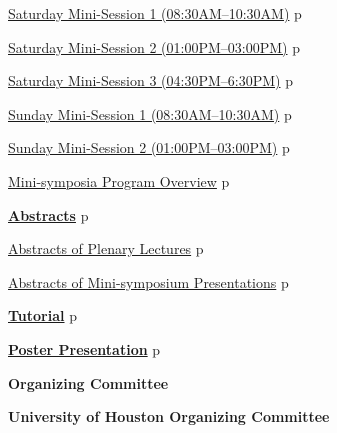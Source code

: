 \noindent\quad\hyperref[mini-saturday1]{{\large Saturday Mini-Session 1 (08:30AM--10:30AM)}}%
\dotfill{}p\pageref{mini-saturday1}
\vspace{1ex}

\noindent\quad\hyperref[mini-saturday2]{{\large Saturday Mini-Session 2 (01:00PM--03:00PM)}}%
\dotfill{}p\pageref{mini-saturday2}
\vspace{1ex}

\noindent\quad\hyperref[mini-saturday3]{{\large Saturday Mini-Session 3 (04:30PM--6:30PM)}}%
\dotfill{}p\pageref{mini-saturday3}
\vspace{2ex}

\noindent\quad\hyperref[mini-sunday1]{{\large Sunday Mini-Session 1 (08:30AM--10:30AM)}}
\dotfill{}p\pageref{mini-sunday1}
\vspace{1ex}

\noindent\quad\hyperref[mini-sunday2]{{\large Sunday Mini-Session 2 (01:00PM--03:00PM)}}%
\dotfill{}p\pageref{mini-sunday2}
\vspace{3ex}

\noindent\quad\hyperref[prog-overview]{{\large Mini-symposia Program Overview}}%
\dotfill{}p\pageref{prog-overview}
\vspace{3ex}

\noindent\hyperref[abstracts]{{\bfseries\large Abstracts}}%
\dotfill{}p\pageref{abstracts}
\vspace{2ex}

\noindent\quad\hyperref[plenary]{{\large  Abstracts of Plenary Lectures}}%
\dotfill{}p\pageref{plenary}
\vspace{1ex}

\noindent\quad\hyperref[absmini]{{\large  Abstracts of Mini-symposium Presentations}}%
\dotfill{}p\pageref{absmini}
\vspace{3ex}

\noindent\hyperref[tutorial]{{\bfseries\large  Tutorial}}%
\dotfill{}p\pageref{tutorial}
\vspace{3ex}

\noindent\hyperref[poster]{{\bfseries\large  Poster Presentation}}
\dotfill{}p\pageref{poster}

\newpage\newpage
\thispagestyle{empty}
\newpage
\clearpage


\thispagestyle{empty}
\label{committee}
\centerline{\bfseries\Large Organizing Committee}
\vspace{10ex}

\noindent
{\bfseries\large  University of Houston Organizing Committee}
\vspace{1ex}

